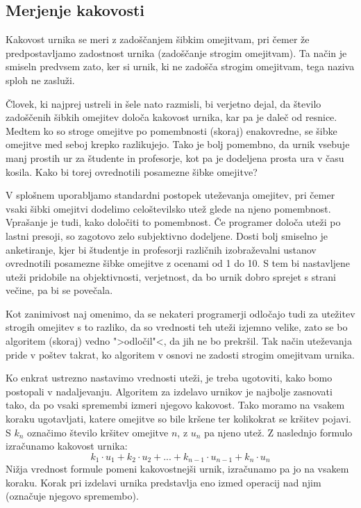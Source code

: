 \documentclass[a4paper,10pt]{article}
\begin{document}
\subsection{Merjenje kakovosti} %

Kakovost urnika se meri z zadoščanjem šibkim omejitvam, pri čemer že predpostavljamo
zadostnost urnika (zadoščanje strogim omejitvam). Ta način je smiseln predvsem zato,
ker si urnik, ki ne zadošča strogim omejitvam, tega naziva sploh ne zasluži.

Človek, ki najprej ustreli in šele nato razmisli, bi verjetno dejal, da število
zadoščenih šibkih omejitev določa kakovost urnika, kar pa je daleč od resnice. Medtem
ko so stroge omejitve po pomembnosti (skoraj) enakovredne, se šibke omejitve med seboj
krepko razlikujejo. Tako je bolj pomembno, da urnik vsebuje manj prostih ur za
študente in profesorje, kot pa je dodeljena prosta ura v času kosila. Kako bi torej
ovrednotili posamezne šibke omejitve?

V splošnem uporabljamo standardni postopek uteževanja omejitev, pri čemer vsaki šibki
omejitvi dodelimo celoštevilsko utež glede na njeno pomembnost. Vprašanje je tudi, kako
določiti to pomembnost. Če programer določa uteži po lastni presoji, so zagotovo zelo
subjektivno dodeljene. Dosti bolj smiselno je anketiranje, kjer bi študentje in profesorji
različnih izobraževalni ustanov ovrednotili posamezne šibke omejitve z ocenami od 1 do 10.
S tem bi nastavljene uteži pridobile na objektivnosti, verjetnost, da bo urnik dobro
sprejet s strani večine, pa bi se povečala.

Kot zanimivost naj omenimo, da se nekateri programerji odločajo tudi za utežitev strogih
omejitev s to razliko, da so vrednosti teh uteži izjemno velike, zato se bo algoritem
(skoraj) vedno ">odločil"<, da jih ne bo prekršil. Tak način uteževanja pride v poštev
takrat, ko algoritem v osnovi ne zadosti strogim omejitvam urnika.

Ko enkrat ustrezno nastavimo vrednosti uteži, je treba ugotoviti, kako bomo postopali
v nadaljevanju. Algoritem za izdelavo urnikov je najbolje zasnovati tako, da po vsaki
spremembi izmeri njegovo kakovost. Tako moramo na vsakem koraku ugotavljati, katere
omejitve so bile kršene ter kolikokrat se kršitev pojavi. S $k_n$ označimo število
kršitev omejitve $n$, z $u_n$ pa njeno utež. Z naslednjo formulo izračunamo
kakovost urnika:
\[ k_{1} \cdot u_{1} + k_{2} \cdot u_{2} + ... + k_{n-1} \cdot u_{n-1} + k_{n} \cdot u_{n} \]
Nižja vrednost formule pomeni kakovostnejši urnik, izračunamo pa jo na vsakem koraku.
Korak pri izdelavi urnika predstavlja eno izmed operacij nad njim (označuje njegovo
spremembo).
\end{document}
